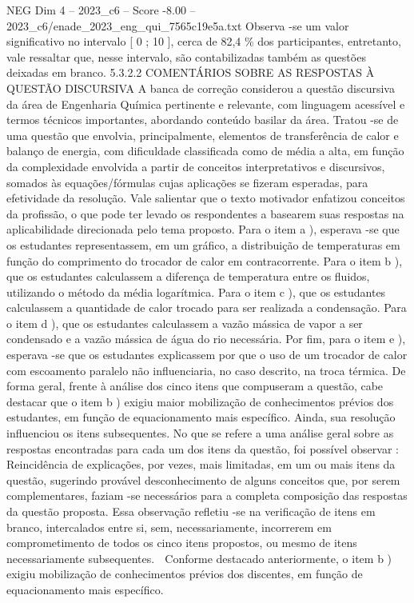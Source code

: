 \begin{textsample}{NEG Dim 4 – 2023\_c6 – Score -8.00 – 2023\_c6/enade\_2023\_eng\_qui\_7565c19e5a.txt}
Observa -se um valor significativo no intervalo [ 0 ; 10 ], cerca de 82,4 \% dos participantes, entretanto, vale ressaltar que, nesse intervalo, são contabilizadas também as questões deixadas em branco. 5.3.2.2 COMENTÁRIOS SOBRE AS RESPOSTAS À QUESTÃO DISCURSIVA A banca de correção considerou a questão discursiva da área de Engenharia Química pertinente e relevante, com linguagem acessível e termos técnicos importantes, abordando conteúdo basilar da área.
Tratou -se de uma questão que envolvia, principalmente, elementos de transferência de calor e balanço de energia, com dificuldade classificada como de média a alta, em função da complexidade envolvida a partir de conceitos interpretativos e discursivos, somados às equações/fórmulas cujas aplicações se fizeram esperadas, para efetividade da resolução.
Vale salientar que o texto motivador enfatizou conceitos da profissão, o que pode ter levado os respondentes a basearem suas respostas na aplicabilidade direcionada pelo tema proposto.
Para o item a ), esperava -se que os estudantes representassem, em um gráfico, a distribuição de temperaturas em função do comprimento do trocador de calor em contracorrente.
Para o item b ), que os estudantes calculassem a diferença de temperatura entre os fluidos, utilizando o método da média logarítmica.
Para o item c ), que os estudantes calculassem a quantidade de calor trocado para ser realizada a condensação.
Para o item d ), que os estudantes calculassem a vazão mássica de vapor a ser condensado e a vazão mássica de água do rio necessária.
Por fim, para o item e ), esperava -se que os estudantes explicassem por que o uso de um trocador de calor com escoamento paralelo não influenciaria, no caso descrito, na troca térmica.
De forma geral, frente à análise dos cinco itens que compuseram a questão, cabe destacar que o item b ) exigiu maior mobilização de conhecimentos prévios dos estudantes, em função de equacionamento mais específico.
Ainda, sua resolução influenciou os itens subsequentes.
No que se refere a uma análise geral sobre as respostas encontradas para cada um dos itens da questão, foi possível observar :  Reincidência de explicações, por vezes, mais limitadas, em um ou mais itens da questão, sugerindo provável desconhecimento de alguns conceitos que, por serem complementares, faziam -se necessários para a completa composição das respostas da questão proposta.
Essa observação refletiu -se na verificação de itens em branco, intercalados entre si, sem, necessariamente, incorrerem em comprometimento de todos os cinco itens propostos, ou mesmo de itens necessariamente subsequentes.  Conforme destacado anteriormente, o item b ) exigiu mobilização de conhecimentos prévios dos discentes, em função de equacionamento mais específico.

\end{textsample}
